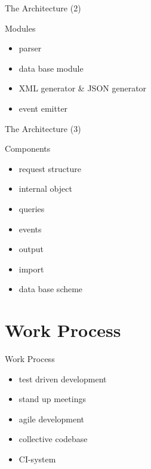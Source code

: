 \documentclass{beamer}
\begin{document}
\begin{frame}{The Architecture (2)}
	\begin{block}{Modules}
		\begin{itemize}
			\item parser
			\item data base module
			\item XML generator \& JSON generator
			\item event emitter
		\end{itemize}
	\end{block}
\end{frame}

\begin{frame}{The Architecture (3)}
	\begin{block}{Components}
		\begin{itemize}
			\item request structure
			\item internal object
			\item queries
			\item events
			\item output
			\item import
			\item data base scheme
		\end{itemize}
	\end{block}
\end{frame}


\section{Work Process}
\begin{frame}{Work Process}
	\begin{itemize}
		\item test driven development
		\item stand up meetings
		\item agile development
		\item collective codebase
		\item CI-system
	\end{itemize}
\end{frame}
\end{document}
